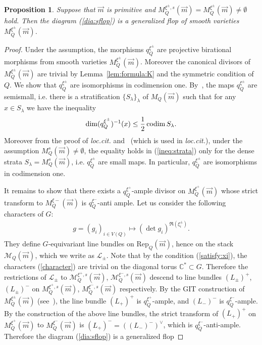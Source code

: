 \documentclass[11pt]{amsart}
\theoremstyle{plain}
\newtheorem{prop}[thm]{Proposition}
\theoremstyle{definition}
\theoremstyle{remark}
\newcommand{\lL}{\mathcal{L}}
\newcommand{\mM}{\mathcal{M}}
\newcommand{\codim}{\mathop{\rm codim}\nolimits}
\begin{document}
\begin{prop}\label{prop:sflop}
Suppose that $\vec{m}$ is primitive and
 $M_{Q}^{\xi^{\pm}, s}(\vec{m})=M_Q^{\xi^{\pm}}(\vec{m}) \neq \emptyset$
hold. Then the diagram (\ref{dia:sflop}) is a generalized flop 
of smooth varieties $M_{Q}^{\xi^{\pm}}(\vec{m})$. 
\end{prop} 
\begin{proof}
Under the assumption, the 
morphisms $q_Q^{\xi^{\pm}}$ are projective birational 
morphisms from smooth varieties $M_Q^{\xi^{\pm}}(\vec{m})$. 
Moreover the canonical divisors of $M_Q^{\xi^{\pm}}(\vec{m})$
are trivial by 
Lemma~\ref{lem:formula:K}
and the symmetric condition of $Q$. 
We show that 
$q_{Q}^{\xi^{\pm}}$ are isomorphisms in codimension one. 
By~\cite[Lemma~4.4]{TodGV}, the maps $q_Q^{\xi^{\pm}}$ are semismall, 
i.e. 
there is a stratification 
$\{S_{\lambda}\}_{\lambda}$ of $M_Q(\vec{m})$ such that 
for any $x \in S_{\lambda}$ 
we have 
the inequality
\begin{align}\label{ineq:strata}
\dim (q^{\xi^{\pm}}_Q)^{-1}(x) \le \frac{1}{2}\codim S_{\lambda}.
\end{align}
 Moreover
from the proof of \textit{loc.cit.} and~\cite[Theorem~1.4]{MeRe}
(which is used in \textit{loc.cit.}), 
 under the 
assumption $M_Q^{s}(\vec{m}) \neq \emptyset$, 
the equality holds in (\ref{ineq:strata})
only for the dense strata 
$S_{\lambda}=M_Q^s(\vec{m})$, i.e. 
$q^{\xi^{\pm}}_Q$ are small maps. 
In particular, $q_Q^{\xi^{\pm}}$ are isomorphisms in codimension one. 

It remains to show that there exists a $q_Q^{\xi^{+}}$-ample divisor 
on $M_Q^{\xi^{+}}(\vec{m})$ whose strict transform to 
$M_Q^{\xi-}(\vec{m})$ is $q_Q^{\xi^{-}}$-anti ample. 
Let us consider the following 
characters of $G$: 
\begin{align}\label{character}
g=(g_i)_{i \in V(Q)} \mapsto 
(\det g_i)^{\Re (\xi^{\pm}_i)}. 
\end{align}
They define 
$G$-equivariant line bundles on 
$\mathrm{Rep}_Q(\vec{m})$, 
hence on the stack $\mM_Q(\vec{m})$, 
which we write as $\lL_{\pm}$. 
Note that by the condition (\ref{satisfy:xi}), 
the characters (\ref{character}) are trivial 
on the diagonal torus $\mathbb{C}^{\ast} \subset G$. 
Therefore the restrictions of $\lL_{\pm}$ to
$\mM_Q^{\xi^{+}, s}(\vec{m})$, 
$\mM_Q^{\xi^{-}, s}(\vec{m})$
descend to line bundles 
$(L_{\pm})^{+}$, $(L_{\pm})^{-}$ on 
$M_Q^{\xi^{+}, s}(\vec{m})$, 
$M_Q^{\xi^{-}, s}(\vec{m})$ respectively. 
By the GIT construction of $M_{Q}^{\xi^{\pm}}(\vec{m})$
(see~\cite{Kin}), 
the line bundle
$(L_{+})^{+}$ is $q_{Q}^{\xi^{+}}$-ample, 
and $(L_-)^-$ is $q_Q^{\xi^{-}}$-ample.  
By the construction
of the above line bundles, 
the strict transform of $(L_+)^{+}$ on $M_Q^{\xi^{+}}(\vec{m})$ to 
$M_Q^{\xi^{-}}(\vec{m})$
is $(L_+)^{-}=((L_-)^{-})^{\vee}$, which is 
$q_{Q}^{\xi^{-}}$-anti-ample. 
Therefore
the diagram (\ref{dia:sflop}) is a generalized flop 
\end{proof}
\end{document}
